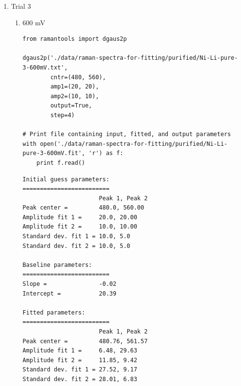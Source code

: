 \documentclass[journal=jpccck,manuscript=suppinfo,email=true]{achemso}
\begin{document}
\begin{enumerate}
\begin{enumerate}
\begin{enumerate}
\begin{verbatim}
Initial guess parameters:
=========================
                      Peak 1, Peak 2
Peak center =         480.0, 560.00
Amplitude fit 1 =     15.0, 15.00
Amplitude fit 2 =     10.0, 10.00
Standard dev. fit 1 = 10.0, 5.0
Standard dev. fit 2 = 10.0, 5.0

Baseline parameters:
=========================
Slope =               -0.01
Intercept =           12.83

Fitted parameters:
=========================
                      Peak 1, Peak 2
Peak center =         481.12, 562.23
Amplitude fit 1 =     5.23, 22.32
Amplitude fit 2 =     8.94, 8.21
Standard dev. fit 1 = 28.56, 8.52
Standard dev. fit 2 = 30.69, 5.68

Calculation output:
========================
Mean peak 1 =         481.1 $\pm$ 0.21
Mean peak 2 =         562.2 $\pm$ 0.43
Height peak 1 =       35.1 $\pm$ 0.39
Height peak 2 =       23.8 $\pm$ 0.46
Area peak 1 =         1203.4
Area peak 2 =         1137.4
\end{verbatim}
\end{enumerate}

\item Trial 3
\label{sec-4-1-0-1-3}
\begin{enumerate}
\item 600 mV
\label{sec-4-1-0-1-3-1}
\begin{verbatim}
from ramantools import dgaus2p

dgaus2p('./data/raman-spectra-for-fitting/purified/Ni-Li-pure-3-600mV.txt',
        cntr=(480, 560),
        amp1=(20, 20),
        amp2=(10, 10),
        output=True,
        step=4)

# Print file containing input, fitted, and output parameters
with open('./data/raman-spectra-for-fitting/purified/Ni-Li-pure-3-600mV.fit', 'r') as f:
    print f.read()
\end{verbatim}

\begin{verbatim}
Initial guess parameters:
=========================
                      Peak 1, Peak 2
Peak center =         480.0, 560.00
Amplitude fit 1 =     20.0, 20.00
Amplitude fit 2 =     10.0, 10.00
Standard dev. fit 1 = 10.0, 5.0
Standard dev. fit 2 = 10.0, 5.0

Baseline parameters:
=========================
Slope =               -0.02
Intercept =           20.39

Fitted parameters:
=========================
                      Peak 1, Peak 2
Peak center =         480.76, 561.57
Amplitude fit 1 =     6.48, 29.63
Amplitude fit 2 =     11.85, 9.42
Standard dev. fit 1 = 27.52, 9.17
Standard dev. fit 2 = 28.01, 6.83


\end{verbatim}
\end{enumerate}
\end{enumerate}
\end{enumerate}
\end{document}
